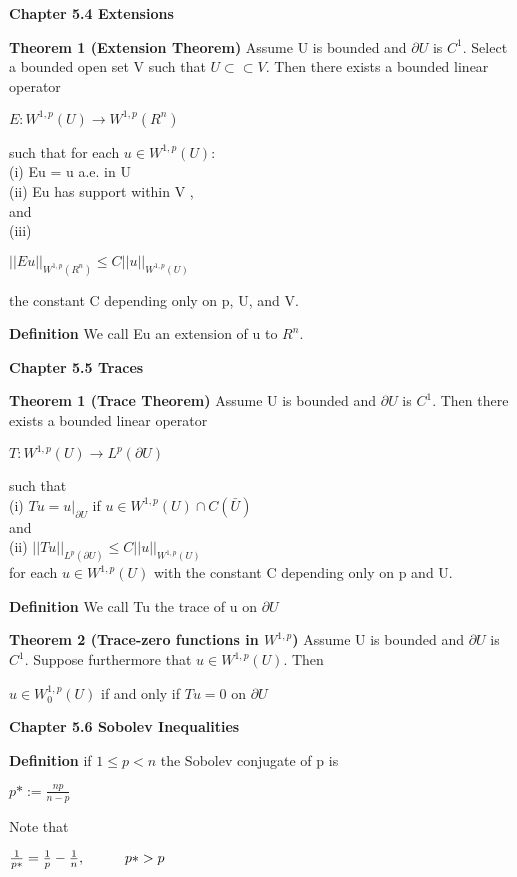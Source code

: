 \documentclass{article}
\newcommand\tab[1][1cm]{\hspace*{#1}}
\begin{document}
\textbf {Chapter 5.4 Extensions}

\textbf {Theorem 1 (Extension Theorem)} Assume U is bounded and $\partial U$ is $C^1$. Select a bounded open set V such that $U \subset \subset V$. Then there exists a bounded linear operator
 \begin{center}
$E: W^{1,p} (U) \to W^{1,p} (R^n)$
\end{center}
such that for each $u \in W^{1, p} (U)$: \\
\tab (i) Eu = u a.e. in U \\
\tab (ii) Eu has support within V , \\
and \\
\tab (iii)
 \begin{center}
$||Eu||_{W^{1,p}(R^n)} \leq C||u||_{W^{1,p}(U)}$
\end{center}
the constant C depending only on p, U, and V.

\textbf {Definition} We call Eu an extension of u to $R^n$.

\textbf {Chapter 5.5 Traces}

\textbf {Theorem 1 (Trace Theorem)} Assume U is bounded and $\partial U$ is $C^1$. Then there exists a bounded linear operator
 \begin{center}
$T : W^{1,p}(U) \to L^p(\partial U)$
\end{center}
such that \\
\tab (i) $Tu = u|_{\partial U}$ if $u \in W^{1,p}(U) \cap C(\bar{U})$ \\
and \\
\tab (ii) $||Tu||_{L^{p}(\partial U)} \leq C ||u||_{W^{1,p}(U)}$ \\
for each $u \in W^{1,p}(U)$ with the constant C depending only on p and U.

\textbf {Definition} We call Tu the trace of u on $\partial U$

\textbf {Theorem 2 (Trace-zero functions in $W^{1,p}$)} Assume U is bounded and $\partial U$ is $C^1$. Suppose furthermore that $u \in W^{1,p}(U)$. Then
 \begin{center}
$u \in W_0^{1,p}(U)$ if and only if $Tu = 0$ on $\partial U$
\end{center}

\textbf {Chapter 5.6 Sobolev Inequalities}

\textbf {Definition} if $1 \leq p < n$ the Sobolev conjugate of p is 
 \begin{center}
$p* := \frac{np}{n-p}$
\end{center}
Note that 
 \begin{center}
$\frac{1}{p*}=\frac{1}{p} - \frac{1}{n}, \tab p* > p$
\end{center}
\end{document}
